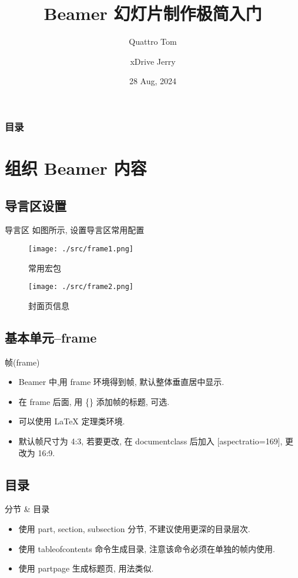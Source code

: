 \documentclass[aspectratio=169]{beamer}  %
\title{Beamer 幻灯片制作极简入门}
\author[Q.Tom, x.Jerry] %
{Quattro Tom\inst{1} \and xDrive Jerry\inst{2}}
\institute[TJU] %
{
  \inst{1}
  College of Electronic and Information Engineering\\
  Tongji University
  \and
  \inst{2}
  School of Automotive Studies\\
  Tongji University
}
\date{28 Aug, 2024}
\begin{document}
\frame{\titlepage}

\begin{frame}
\frametitle{目录}
    \tableofcontents
\end{frame}

\section{组织 Beamer 内容}
\subsection{导言区设置}
\begin{frame}{导言区}
    如图所示, 设置导言区常用配置
    \begin{figure}[htbp]
        \centering
        \begin{minipage}[t]{0.48\textwidth}
            \centering
            \texttt{[image: ./src/frame1.png]}
            \caption{常用宏包}
        \end{minipage}
        \begin{minipage}[t]{0.48\textwidth}
            \centering
            \texttt{[image: ./src/frame2.png]}
            \caption{封面页信息}
        \end{minipage}
    \end{figure}
\end{frame}

\subsection{基本单元--frame}
\begin{frame}{帧(frame)}
    \begin{itemize}
        \item Beamer 中,用 frame 环境得到帧, 默认整体垂直居中显示.
        \item 在 frame 后面, 用 \{\} 添加帧的标题, 可选.
        \item 可以使用 \LaTeX{} 定理类环境.
        \item 默认帧尺寸为 4:3, 若要更改, 在 documentclass 后加入 [aspectratio=169], 更改为 16:9.
    \end{itemize}
\end{frame}

\subsection{目录}
\begin{frame}{分节 \& 目录}
    \begin{itemize}
        \item 使用 part, section, subsection 分节, 不建议使用更深的目录层次.
        \item 使用 tableofcontents 命令生成目录, 注意该命令必须在单独的帧内使用.
        \item 使用 partpage 生成标题页, 用法类似.
    \end{itemize}
\end{frame}
\end{document}

